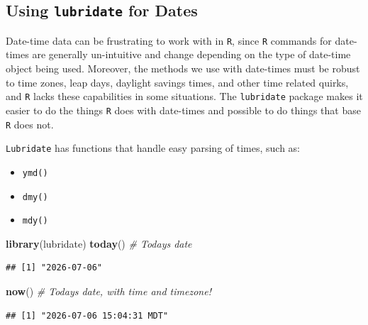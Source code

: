 \documentclass[
  10pt,
  letterpaper,
  twoside,
  openright]{book}
\newenvironment{Shaded}{\begin{snugshade}}{\end{snugshade}}
\newcommand{\CommentTok}[1]{\textcolor[rgb]{0.56,0.35,0.01}{\textit{#1}}}
\newcommand{\FunctionTok}[1]{\textcolor[rgb]{0.13,0.29,0.53}{\textbf{#1}}}
\newcommand{\NormalTok}[1]{#1}
\providecommand{\tightlist}{%
  \setlength{\itemsep}{0pt}\setlength{\parskip}{0pt}}
\begin{document}
\hypertarget{using-lubridate-for-dates}{%
\subsection{\texorpdfstring{Using \texttt{lubridate} for
Dates}{Using lubridate for Dates}}\label{using-lubridate-for-dates}}

Date-time data can be frustrating to work with in \texttt{R}, since
\texttt{R} commands for date-times are generally un-intuitive and change
depending on the type of date-time object being used. Moreover, the
methods we use with date-times must be robust to time zones, leap days,
daylight savings times, and other time related quirks, and \texttt{R}
lacks these capabilities in some situations. The \texttt{lubridate}
package makes it easier to do the things \texttt{R} does with date-times
and possible to do things that base \texttt{R} does not.

\texttt{Lubridate} has functions that handle easy parsing of times, such
as:

\begin{itemize}
\tightlist
\item
  \texttt{ymd()}
\item
  \texttt{dmy()}
\item
  \texttt{mdy()}
\end{itemize}

\begin{Shaded}
\begin{Highlighting}[]
\FunctionTok{library}\NormalTok{(lubridate)}
\FunctionTok{today}\NormalTok{() }\CommentTok{\# Today\textquotesingle{}s date}
\end{Highlighting}
\end{Shaded}

\begin{verbatim}
## [1] "2026-07-06"
\end{verbatim}

\begin{Shaded}
\begin{Highlighting}[]
\FunctionTok{now}\NormalTok{() }\CommentTok{\# Today\textquotesingle{}s date, with time and timezone!}
\end{Highlighting}
\end{Shaded}

\begin{verbatim}
## [1] "2026-07-06 15:04:31 MDT"
\end{verbatim}
\end{document}

